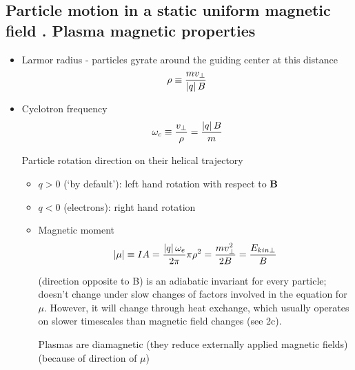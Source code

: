 \documentclass[PlasmaNotes.tex]{subfiles}
\begin{document}
	\subsection{Particle motion in a static uniform magnetic field . Plasma magnetic properties} 
		\begin{itemize}
			\item Larmor radius - particles gyrate around the guiding center at this distance
			\[\rho \equiv \frac{m v_{\perp}}{\left| q \right| B}\]
			\item Cyclotron frequency
			\[\omega_c \equiv \frac{v_{\perp}}{\rho} = \frac{\left| q \right| B}{m}\]
			
			Particle rotation direction on their helical trajectory
			\begin{itemize}
			\item $q>0$ (`by default'): left hand rotation with respect to $\mathbf{B}$
			\item $q<0$ (electrons): right hand rotation
			
			\item Magnetic moment
			\[\left| \mathbf{\mu} \right| \equiv I A = \frac{\left| q \right|\omega_e}{2\pi} \pi \rho^2 = \frac{m v_{\perp}^2}{2 B} = \frac{E_{kin \perp}}{B}\]
			
			(direction opposite to B)
			is an adiabatic invariant for every particle; doesn't change under slow changes of factors involved in the equation for $\mu$. However, it will change through heat exchange, which usually operates on slower timescales than magnetic field changes (see 2c).
			
			Plasmas are diamagnetic (they reduce externally applied magnetic fields) (because of direction of $\mu$)
			\end{itemize}
		\end{itemize}
\end{document}
